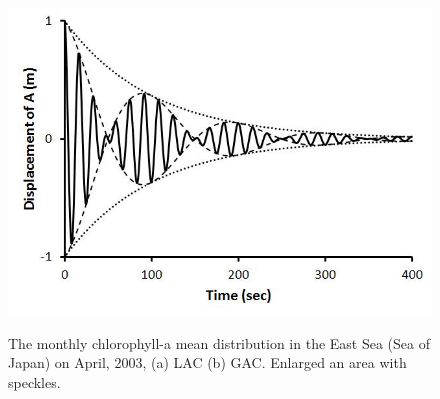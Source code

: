     \begin{figure}[t]
  	\centering
  	\includegraphics[width=0.8\linewidth]{../images/monHISSPEC}\\
  	\caption{The monthly chlorophyll-a mean distribution in the East Sea (Sea of Japan) on April, 2003, (a) LAC (b) GAC. Enlarged an area with speckles.}
  	\label{fig:monHISSPEC}
  \end{figure}
  
